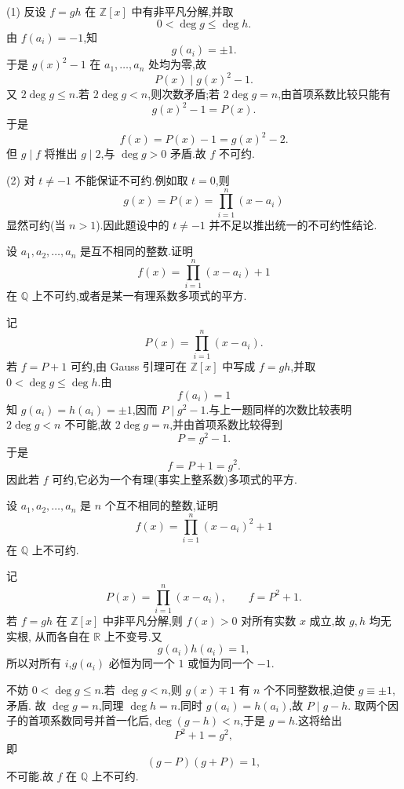\begin{solution}

(1) 反设 $f=gh$ 在 $\mathbb{Z}[x]$ 中有非平凡分解,并取
\[
  0<\deg g\le\deg h.
\]
由 $f(a_i)=-1$,知
\[
  g(a_i)=\pm1.
\]
于是 $g(x)^2-1$ 在 $a_1,\ldots,a_n$ 处均为零,故
\[
  P(x)\mid g(x)^2-1.
\]
又 $2\deg g\le n$.若 $2\deg g<n$,则次数矛盾;若 $2\deg g=n$,由首项系数比较只能有
\[
  g(x)^2-1=P(x).
\]
于是
\[
  f(x)=P(x)-1=g(x)^2-2.
\]
但 $g\mid f$ 将推出 $g\mid2$,与 $\deg g>0$ 矛盾.故 $f$ 不可约.

(2) 对 $t\ne-1$ 不能保证不可约.例如取 $t=0$,则
\[
  g(x)=P(x)=\prod\limits_{i=1}^{n}(x-a_i)
\]
显然可约(当 $n>1$).因此题设中的 $t\ne-1$ 并不足以推出统一的不可约性结论.
\end{solution}

\begin{example}
设 $a_1,a_2,\ldots,a_n$ 是互不相同的整数.证明
\[
  f(x)=\prod\limits_{i=1}^{n}(x-a_i)+1
\]
在 $\mathbb{Q}$ 上不可约,或者是某一有理系数多项式的平方.
\end{example}
\exampleblank

\begin{solution}
记
\[
  P(x)=\prod\limits_{i=1}^{n}(x-a_i).
\]
若 $f=P+1$ 可约,由 Gauss 引理可在 $\mathbb{Z}[x]$ 中写成 $f=gh$,并取
$0<\deg g\le\deg h$.由
\[
  f(a_i)=1
\]
知 $g(a_i)=h(a_i)=\pm1$,因而 $P\mid g^2-1$.与上一题同样的次数比较表明
$2\deg g<n$ 不可能,故 $2\deg g=n$,并由首项系数比较得到
\[
  P=g^2-1.
\]
于是
\[
  f=P+1=g^2.
\]
因此若 $f$ 可约,它必为一个有理(事实上整系数)多项式的平方.
\end{solution}

\begin{example}
设 $a_1,a_2,\ldots,a_n$ 是 $n$ 个互不相同的整数,证明
\[
  f(x)=\prod\limits_{i=1}^{n}(x-a_i)^2+1
\]
在 $\mathbb{Q}$ 上不可约.
\end{example}
\exampleblank

\begin{solution}
记
\[
  P(x)=\prod\limits_{i=1}^{n}(x-a_i),
  \qquad
  f=P^2+1.
\]
若 $f=gh$ 在 $\mathbb{Z}[x]$ 中非平凡分解,则 $f(x)>0$ 对所有实数 $x$ 成立,故 $g,h$ 均无实根,
从而各自在 $\mathbb{R}$ 上不变号.又
\[
  g(a_i)h(a_i)=1,
\]
所以对所有 $i$,$g(a_i)$ 必恒为同一个 $1$ 或恒为同一个 $-1$.

不妨 $0<\deg g\le n$.若 $\deg g<n$,则 $g(x)\mp1$ 有 $n$ 个不同整数根,迫使 $g\equiv\pm1$,矛盾.
故 $\deg g=n$,同理 $\deg h=n$.同时 $g(a_i)=h(a_i)$,故 $P\mid g-h$.
取两个因子的首项系数同号并首一化后,$\deg(g-h)<n$,于是 $g=h$.这将给出
\[
  P^2+1=g^2,
\]
即
\[
  (g-P)(g+P)=1,
\]
不可能.故 $f$ 在 $\mathbb{Q}$ 上不可约.
\end{solution}

